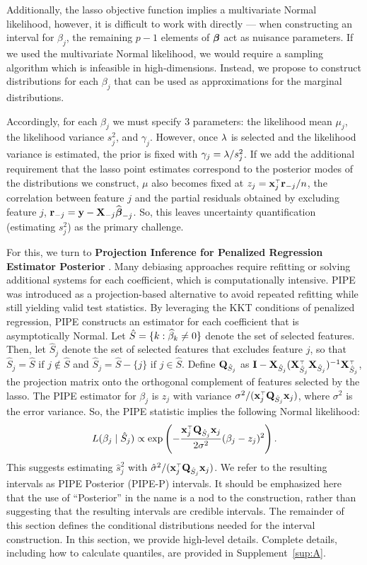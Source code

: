 Additionally, the lasso objective function implies a multivariate Normal likelihood, however, it is difficult to work with directly --- when constructing an interval for $\beta_j$, the remaining $p-1$ elements of $\boldsymbol{\beta}$ act as nuisance parameters. If we used the multivariate Normal likelihood, we would require a sampling algorithm which is infeasible in high-dimensions. Instead, we propose to construct distributions for each $\beta_j$ that can be used as approximations for the marginal distributions.

Accordingly, for each $\beta_j$ we must specify 3 parameters: the likelihood mean $\mu_j$, the likelihood variance $s_j^2$, and $\gamma_j$. However, once $\lambda$ is selected and the likelihood variance is estimated, the prior is fixed with $\gamma_j = \lambda / s_j^2$. If we add the additional requirement that the lasso point estimates correspond to the posterior modes of the distributions we construct, $\mu$ also becomes fixed at $z_j = \mathbf{x}_j ^{\scriptscriptstyle\top}\mathbf{r}_{-j} / n$, the correlation between feature $j$ and the partial residuals obtained by excluding feature $j$, $\mathbf{r}_{-j} = \mathbf{y} - \mathbf{X}_{-j}\widehat{\boldsymbol{\beta}}_{-j}$. So, this leaves uncertainty quantification (estimating $s_j^2$) as the primary challenge.

For this, we turn to \textbf{Projection Inference for Penalized Regression Estimator Posterior} \citep[PIPE-P; ][]{Dai2019}. Many debiasing approaches require refitting or solving additional systems for each coefficient, which is computationally intensive. PIPE was introduced as a projection-based alternative to avoid repeated refitting while still yielding valid test statistics. By leveraging the KKT conditions of penalized regression, PIPE constructs an estimator for each coefficient that is asymptotically Normal. Let $\hat{S} = \lbrace k: \widehat{\beta}_k \neq  0 \rbrace$ denote the set of selected features. Then, let $\hat{S}_j$ denote the set of selected features that excludes feature $j$, so that $\hat{S}_j = \hat{S} \text{ if } j \notin \hat{S}$ and $\hat{S}_j = \hat{S} - \lbrace j \rbrace \text{ if } j \in \hat{S}$. Define $\mathbf{Q}_{\hat{S}_j}$ as $\mathbf{I} - \mathbf{X}_{\hat{S}_j}(\mathbf{X}_{\hat{S}_j} ^{\scriptscriptstyle\top} \mathbf{X}_{\hat{S}_j})^{-1} \mathbf{X}_{\hat{S}_j} ^{\scriptscriptstyle\top}$, the projection matrix onto the orthogonal complement of features selected by the lasso. The PIPE estimator for $\beta_j$ is $z_j$ with variance $\sigma^2/ (\mathbf{x}_j ^{\scriptscriptstyle\top} \mathbf{Q}_{\hat{S}_j} \mathbf{x}_j)$, where $\sigma^2$ is the error variance. So, the PIPE statistic implies the following Normal likelihood:
$$ L(\beta_j \mid \hat{S}_j) \propto \exp\left(-\frac{\mathbf{x}_j ^{\scriptscriptstyle\top} \mathbf{Q}_{\hat{S}_j} \mathbf{x}_j}{2\sigma^2}(\beta_{j} - z_{j})^2\right). $$
This suggests estimating $\hat{s}_j^2$ with $\hat{\sigma}^2/ (\mathbf{x}_j ^{\scriptscriptstyle\top} \mathbf{Q}_{\hat{S}_j} \mathbf{x}_j)$. We refer to the resulting intervals as PIPE Posterior (PIPE-P) intervals. It should be emphasized here that the use of ``Posterior'' in the name is a nod to the construction, rather than suggesting that the resulting intervals are credible intervals. The remainder of this section defines the conditional distributions needed for the interval construction. In this section, we provide high-level details. Complete details, including how to calculate quantiles, are provided in Supplement~\ref{sup:A}.

